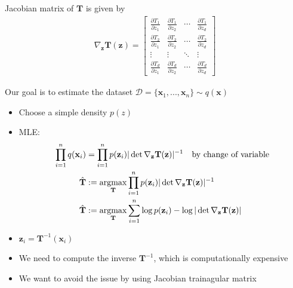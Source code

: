 Jacobian matrix of $\mathbf{T}$ is given by
\begin{align*}
 \nabla_{\mathbf{z}}\mathbf{T}(\mathbf{z})  = \begin{bmatrix}
    \frac{\partial T_1}{\partial z_1} &\frac{\partial T_1}{\partial z_2} &\cdots &\frac{\partial T_1}{\partial z_d} \\
    \frac{\partial T_2}{\partial z_1} &\frac{\partial T_2}{\partial z_2} &\cdots &\frac{\partial T_2}{\partial z_d} \\
    \vdots& \vdots &\ddots &\vdots\\
    \frac{\partial T_d}{\partial z_1} &\frac{\partial T_d}{\partial z_2} &\cdots &\frac{\partial T_d}{\partial z_d} 
 \end{bmatrix}
\end{align*}

Our goal is to estimate the dataset $\mathcal{D} = \{\mathbf{x}_1, ..., \mathbf{x}_n\}\sim q(\mathbf{x})$

\begin{itemize}
    \item Choose a simple density $p(z)$
    \item MLE:
    \begin{align*}
        \prod_{i=1}^{n}q(\mathbf{x}_i) &= \prod_{i=1}^{n}p(\mathbf{z}_i)|\det \nabla_{\mathbf{z}}\mathbf{T}(\mathbf{z})|^{-1} \quad \textrm{by change of variable}\\
        \hat{\mathbf{T}} &:= \operatorname*{\operatorname{argmax}}_{\mathbf{T}}\prod_{i=1}^{n} p(\mathbf{z}_i)|\det \nabla_{\mathbf{z}}\mathbf{T}(\mathbf{z})|^{-1}\\
        \hat{\mathbf{T}} &:= \operatorname*{\operatorname{argmax}}_{\mathbf{T}}\sum_{i=1}^{n} \log p(\mathbf{z}_i) - \log |\det \nabla_{\mathbf{z}}\mathbf{T}(\mathbf{z})|
    \end{align*}
    \item $\mathbf{z}_i = \mathbf{T}^{-1}(\mathbf{x}_i)$
    \item We need to compute the inverse $\mathbf{T}^{-1}$, which is computationally expensive
    \item We want to avoid the issue by using Jacobian trainagular matrix 
\end{itemize}

